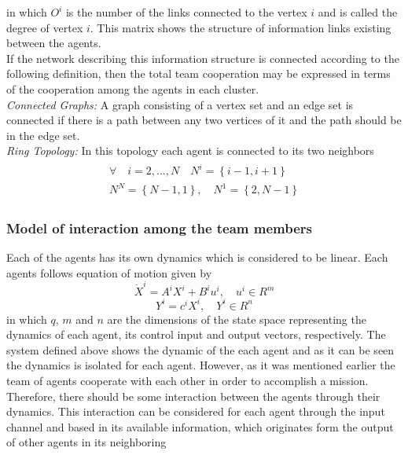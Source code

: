\documentclass[conference]{IEEEtran}
\begin{document}
in which $O^{i}$ is the number of the links connected to the vertex $i$ and is called the degree of vertex $i$. This matrix shows the structure of information links existing between the agents.\\
If the network describing this information structure is connected according to the following definition, then the total team cooperation may be expressed in terms of the cooperation among the agents in each cluster.\\
\textit{Connected Graphs:} A graph consisting of a vertex set and an edge set is connected if there is a path between any two vertices of it and the path should be in the edge set.\\
\textit{Ring Topology:} In this topology each agent is connected to its two neighbors 
\begin{multline}\label{eq:ringTopology}
\begin{split}
\forall \quad i=2,...,N \quad  N^{i}=\left\{i-1,i+1\right\}\\
N^{N}=\left\{N-1,1\right\}, \quad N^{1}=\left\{2,N-1\right\}
\end{split}
\end{multline}


\subsubsection{Model of interaction among the team members}

Each of the agents has its own dynamics which is considered to be linear. Each agents follows equation of motion given by 
\begin{equation}\label{eq:agentEquation}
\dot{X}^{i}=A^{i}X^{i}+B^{i}u^{i}, \quad u^{i}\in R^{m}
\end{equation}
\begin{equation}\label{eq:agentEquationOutput}
Y^{i}=c^{i}X^{i}, \quad Y^{i}\in R^{n}
\end{equation}
in which $q$, $m$ and $n$ are the dimensions of the state space representing the dynamics of each agent, its control input and output vectors, respectively. The system defined above shows the dynamic of the each agent and as it can be seen the dynamics is isolated for each agent. However, as it was mentioned earlier the team of agents cooperate with each other in order to accomplish a mission. Therefore, there should be some interaction between the agents through their dynamics. This interaction can be considered for each agent through the input channel and based in its available information, which originates form the output of other agents in its neighboring  
\end{document}
